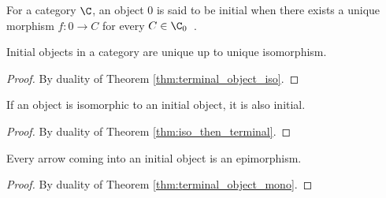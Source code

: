 \begin{definition}
  For a category $\C$, an object $0$ is said to be initial when there exists a
  unique morphism $f: 0\to C$ for every $C\in
  \C_0$~\parencite[p.~48]{leinster:basic_category_theory}.
\end{definition}

\begin{theorem}
  Initial objects in a category are unique up to unique isomorphism.

  \begin{proof}
    By duality of Theorem \ref{thm:terminal_object_iso}.
  \end{proof}
\end{theorem}

\begin{theorem}\label{thm:iso_initial_object}
  If an object is isomorphic to an initial object, it is also initial.

  \begin{proof}
    By duality of Theorem \ref{thm:iso_then_terminal}.
  \end{proof}
\end{theorem}

\begin{theorem}
  Every arrow coming into an initial object is an epimorphism.

  \begin{proof}
    By duality of Theorem \ref{thm:terminal_object_mono}.
  \end{proof}
\end{theorem}